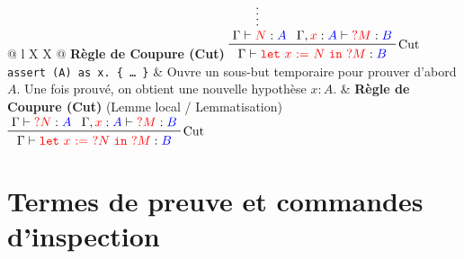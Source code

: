\documentclass[11pt,a4paper]{article}
\newcommand{\term}[1]{\textcolor{red}{#1}}
\newcommand{\type}[1]{\textcolor{blue}{#1}}
\begin{document}
\begin{xltabular}{\textwidth}{@{} l X X @{}}
  \textbf{Règle de Coupure (Cut)}
  \vspace{0.2cm} \newline
  $\prftree[r]{Cut}{\prfsummary{\Gamma \vdash \term{N} : \type{A}}}{\Gamma, \term{x} : \type{A} \vdash \term{{?}M} : \type{B}}{\Gamma \vdash \term{\mathtt{let}\ x \ \mathtt{:=}\ N\ \mathtt{in}\ {?}M} : \type{B}}$
  \\
  \midrule
  \texttt{assert (A) as x. \{ \dots\ \}} &
  Ouvre un sous-but temporaire pour prouver d'abord $A$. Une fois prouvé, on obtient une nouvelle hypothèse $x : A$. &
  \textbf{Règle de Coupure (Cut)} \newline (Lemme local / Lemmatisation) \newline
  \vspace{0.2cm} \newline
  $\prftree[r]{Cut}{\prfassumption{\Gamma \vdash \term{{?}N} : \type{A}}}{\Gamma, \term{x} : \type{A} \vdash \term{{?}M} : \type{B}}{\Gamma \vdash \term{\mathtt{let}\ x \ \mathtt{:=}\ {?}N\ \mathtt{in}\ {?}M} : \type{B}}$\\
  \bottomrule
\end{xltabular}

\section{Termes de preuve et commandes d'inspection}
\end{document}
